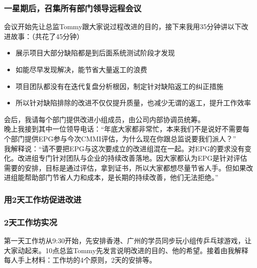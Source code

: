 \hypertarget{ux4e00ux661fux671fux540eux53ecux96c6ux6240ux6709ux90e8ux95e8ux9886ux5bfcux8fdcux7a0bux4f1aux8bae}{%
\subsubsection{一星期后，召集所有部门领导远程会议}\label{ux4e00ux661fux671fux540eux53ecux96c6ux6240ux6709ux90e8ux95e8ux9886ux5bfcux8fdcux7a0bux4f1aux8bae}}

会议开始先让总监Tommy跟大家说过程改进的目的，接下来我用35分钟讲以下改进故事：（共花了45分钟）

\begin{itemize}
\tightlist
\item
  展示项目大部分缺陷都是到后面系统测试阶段才发现
\item
  如能尽早发现解决，能节省大量返工的浪费
\item
  项目团队都没有在迭代复盘分析根因，制定针对缺陷返工的纠正措施
\item
  所以针对缺陷排除的改进不仅仅提升质量，也减少无谓的返工，提升工作效率
\end{itemize}

会后，我请每个部门提供改进小组成员，由公司内部协调员统筹。\\
晚上我接到其中一位领导电话：``年底大家都非常忙，本来我们不是说好不需要每个部门提供EPG参与今次CMMI评估，为什么现在你跟总监说要我们派人？''\\
我解释说：``请不要把EPG与这次要成立的改进组混在一起。对EPG的要求没有变化。改进组专门针对团队与企业的持续改善落地。因大家都认为EPG是针对评估需要的安排，目标是通过评估，拿到证书，所以大家都想尽量节省人手。但如果改进组能帮助部门节省人力和成本，是长期的持续改善，他们无法拒绝。''

\hypertarget{ux75282ux5929ux5de5ux4f5cux574aux4fc3ux8fdbux6539ux8fdb}{%
\subsubsection{用2天工作坊促进改进}\label{ux75282ux5929ux5de5ux4f5cux574aux4fc3ux8fdbux6539ux8fdb}}

\hypertarget{ux5929ux5de5ux4f5cux574aux5b9eux51b5}{%
\subsubsection{2天工作坊实况}\label{ux5929ux5de5ux4f5cux574aux5b9eux51b5}}

第一天工作坊从9:30开始，先安排香港、广州的学员同步玩小组传乒乓球游戏，让大家动起来。10点总监Tommy先发言说明改进的目的、他的希望。接着由我解释每人手上材料：工作坊的4个原则，2天的安排等。

